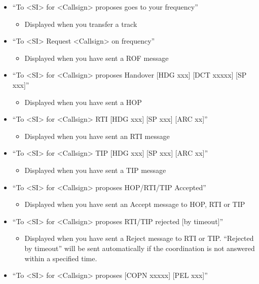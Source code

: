 \documentclass[11pt,a4paper,oldfontcommands]{memoir}
\begin{document}
\begin{itemize}
    \item“To <SI> for <Callsign> proposes goes to your frequency”
        \begin{itemize}
             \item Displayed when you transfer a track
        \end{itemize}
    \item“To <SI> Request <Callsign> on frequency”
        \begin{itemize}
             \item Displayed when you have sent a ROF message
        \end{itemize}
    \item“To <SI> for <Callsign> proposes Handover [HDG xxx] [DCT xxxxx] [SP xxx]”
        \begin{itemize}
             \item Displayed when you have sent a HOP
        \end{itemize}
    \item“To <SI> for <Callsign> RTI [HDG xxx] [SP xxx] [ARC xx]”
        \begin{itemize}
             \item Displayed when you have sent an RTI message
        \end{itemize}
    \item“To <SI> for <Callsign> TIP [HDG xxx] [SP xxx] [ARC xx]”
        \begin{itemize}
             \item Displayed when you have sent a TIP message
        \end{itemize}
    \item“To <SI> for <Callsign> proposes HOP/RTI/TIP Accepted”
        \begin{itemize}
             \item Displayed when you have sent an Accept message to HOP, RTI or TIP
        \end{itemize}
    \item“To <SI> for <Callsign> proposes RTI/TIP rejected [by timeout]”
        \begin{itemize}
             \item Displayed when you have sent a Reject message to RTI or TIP. “Rejected by timeout” will be sent automatically if the coordination is not answered within a specified time.
        \end{itemize}
    \item“To <SI> for <Callsign> proposes [COPN xxxxx] [PEL xxx]”

\end{itemize}
\end{document}
